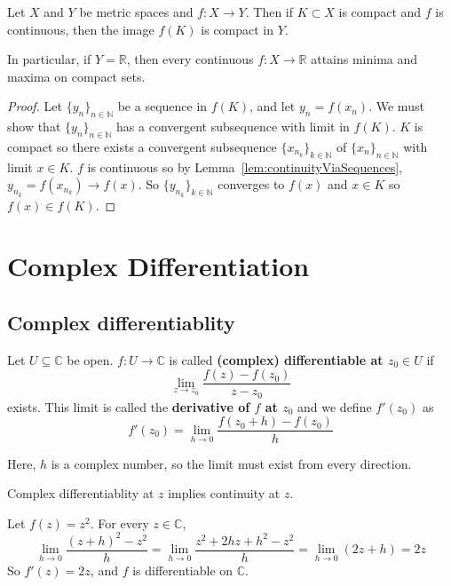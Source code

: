 \begin{theorem}
	Let $X$ and $Y$ be metric spaces and $f: X \to Y$. Then if $K \subset X$ is compact and $f$ is continuous, then the image $f(K)$ is compact in $Y$.

	In particular, if $Y = \mathbb{R}$, then every continuous $f: X \to \mathbb{R}$ attains minima and maxima on compact sets.
\end{theorem}

\begin{proof}
	Let $\{ y_n \}_{n \in \mathbb{N}}$ be a sequence in $f(K)$, and let $y_n = f(x_n)$. We must show that $\{ y_n \}_{n \in \mathbb{N}}$ has a convergent subsequence with limit in $f(K)$. $K$ is compact so there exists a convergent subsequence $\{ x_{n_k} \}_{k \in \mathbb{N}}$ of $\{ x_n \}_{n \in \mathbb{N}}$ with limit $x \in K$. $f$ is continuous so by Lemma~\ref{lem:continuityViaSequences}, $y_{n_k} = f(x_{n_k}) \to f(x)$. So $\{ y_{n_k} \}_{k \in \mathbb{N}}$ converges to $f(x)$ and $x \in K$ so $f(x) \in f(K)$.
\end{proof}

\section{Complex Differentiation}

\subsection{Complex differentiablity}

\begin{definition}\label{def:complexDifferentiablity}
	Let $U \subseteq \mathbb{C}$ be open. $f: U \to \mathbb{C}$ is called \textbf{(complex) differentiable at $z_0 \in U$} if
	\[
		\lim_{z \to z_0} \frac{f(z) - f(z_0)}{z - z_0}
	\]
	exists. This limit is called the \textbf{derivative of $f$ at $z_0$} and we define $f'(z_0)$ as
	\[
		f'(z_0) = \lim_{h \to 0} \frac{f(z_0 + h) - f(z_0)}{h}
	\]
\end{definition}

\begin{remark}
	Here, $h$ is a complex number, so the limit must exist from every direction.
\end{remark}

\begin{remark}
	Complex differentiablity at $z$ implies continuity at $z$.
\end{remark}

\begin{example}
	Let $f(z) = z^2$. For every $z \in \mathbb{C}$,
	\[
		\lim_{h \to 0} \frac{{(z + h)}^2 - z^2}{h} = \lim_{h \to 0} \frac{z^2 + 2hz + h^2 - z^2}{h} = \lim_{h \to 0} (2z + h) = 2z
	\]
	So $f'(z) = 2z$, and $f$ is differentiable on $\mathbb{C}$.
\end{example}


